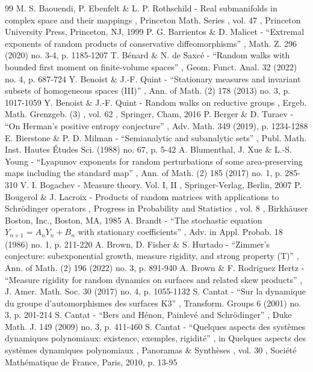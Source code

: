 \documentclass[11pt]{article}
\theoremstyle{plain}
\theoremstyle{definition}
\numberwithin{equation}{section}
\begin{document}
\begin{thebibliography}{99}
 M. S. Baouendi, P. Ebenfelt \& L. P. Rothschild - Real submanifolds in complex space and their mappings , Princeton Math. Series , vol. 47 , Princeton University Press, Princeton, NJ, 1999
 P. G. Barrientos \& D. Malicet - “Extremal exponents of random products of conservative diffeomorphisms” , Math. Z. 296 (2020) no. 3-4, p. 1185-1207
 T. Bénard \& N. de Saxcé - “Random walks with bounded first moment on finite-volume spaces” , Geom. Funct. Anal. 32 (2022) no. 4, p. 687-724
 Y. Benoist \& J.-F. Quint - “Stationary measures and invariant subsets of homogeneous spaces (III)” , Ann. of Math. (2) 178 (2013) no. 3, p. 1017-1059
 Y. Benoist \& J.-F. Quint - Random walks on reductive groups , Ergeb. Math. Grenzgeb. (3) , vol. 62 , Springer, Cham, 2016
 P. Berger \& D. Turaev - “On Herman’s positive entropy conjecture” , Adv. Math. 349 (2019), p. 1234-1288
 E. Bierstone \& P. D. Milman - “Semianalytic and subanalytic sets” , Publ. Math. Inst. Hautes Études Sci. (1988) no. 67, p. 5-42
 A. Blumenthal, J. Xue \& L.-S. Young - “Lyapunov exponents for random perturbations of some area-preserving maps including the standard map” , Ann. of Math. (2) 185 (2017) no. 1, p. 285-310
 V. I. Bogachev - Measure theory. Vol. I, II , Springer-Verlag, Berlin, 2007
 P. Bougerol \& J. Lacroix - Products of random matrices with applications to Schrödinger operators , Progress in Probability and Statistics , vol. 8 , Birkhäuser Boston, Inc., Boston, MA, 1985
 A. Brandt - “The stochastic equation $Y_{n+1}=A_nY_n+B_n$ with stationary coefficients” , Adv. in Appl. Probab. 18 (1986) no. 1, p. 211-220
 A. Brown, D. Fisher \& S. Hurtado - “Zimmer’s conjecture: subexponential growth, measure rigidity, and strong property (T)” , Ann. of Math. (2) 196 (2022) no. 3, p. 891-940
 A. Brown \& F. Rodriguez Hertz - “Measure rigidity for random dynamics on surfaces and related skew products” , J. Amer. Math. Soc. 30 (2017) no. 4, p. 1055-1132
 S. Cantat - “Sur la dynamique du groupe d’automorphismes des surfaces K3” , Transform. Groups 6 (2001) no. 3, p. 201-214
 S. Cantat - “Bers and Hénon, Painlevé and Schrödinger” , Duke Math. J. 149 (2009) no. 3, p. 411-460
 S. Cantat - “Quelques aspects des systèmes dynamiques polynomiaux: existence, exemples, rigidité” , in Quelques aspects des systèmes dynamiques polynomiaux , Panoramas \& Synthèses , vol. 30 , Société Mathématique de France, Paris, 2010, p. 13-95

\end{thebibliography}
\end{document}
